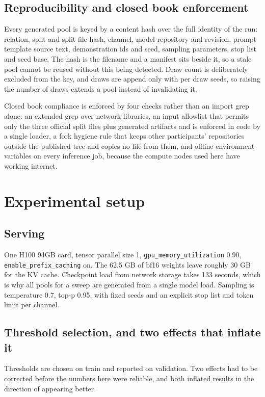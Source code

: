 \documentclass[11pt]{article}
\begin{document}
\subsection{Reproducibility and closed book enforcement}

Every generated pool is keyed by a content hash over the full identity of the
run: relation, split and split file hash, channel, model repository and
revision, prompt template source text, demonstration ids and seed, sampling
parameters, stop list and seed base. The hash is the filename and a manifest
sits beside it, so a stale pool cannot be reused without this being detected.
Draw count is deliberately excluded from the key, and draws are append only with
per draw seeds, so raising the number of draws extends a pool instead of
invalidating it.

Closed book compliance is enforced by four checks rather than an import grep
alone: an extended grep over network libraries, an input allowlist that permits
only the three official split files plus generated artifacts and is enforced in
code by a single loader, a fork hygiene rule that keeps other participants'
repositories outside the published tree and copies no file from them, and offline
environment variables on every inference job, because the compute nodes used here
have working internet.

\section{Experimental setup}

\subsection{Serving}

One H100 94GB card, tensor parallel size 1, \texttt{gpu\_memory\_utilization}
0.90, \texttt{enable\_prefix\_caching} on. The 62.5 GB of bf16 weights leave
roughly 30 GB for the KV cache. Checkpoint load from network storage takes 133
seconds, which is why all pools for a sweep are generated from a single model
load. Sampling is temperature 0.7, top-p 0.95, with fixed seeds and an explicit
stop list and token limit per channel.

\subsection{Threshold selection, and two effects that inflate it}

Thresholds are chosen on train and reported on validation. Two effects had to be
corrected before the numbers here were reliable, and both inflated results in the
direction of appearing better.
\end{document}
